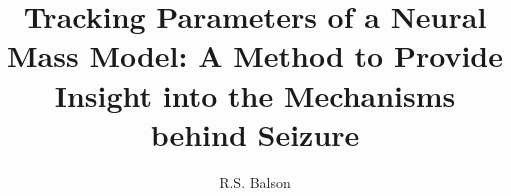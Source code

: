 \documentclass[a4paper,twoside,10pt]{article}%
\begin{document}
\title{Tracking Parameters of a Neural Mass Model: A Method to Provide Insight into the Mechanisms behind Seizure}
\author{R.S. Balson}
\maketitle


%






%

%
%





\end{document}
